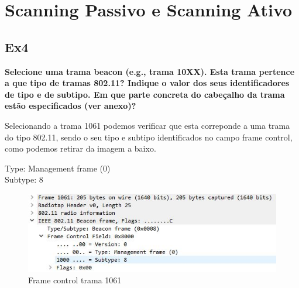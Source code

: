 \documentclass{article}
\begin{document}
\section{Scanning Passivo e Scanning Ativo}
\subsection{Ex4}
\textbf{Selecione uma trama beacon (e.g., trama 10XX). Esta trama pertence a que tipo de tramas 802.11? Indique o valor dos seus identificadores de tipo e de subtipo. Em que parte concreta do cabeçalho da trama estão especificados (ver anexo)?
}\\\par
Selecionando a trama 1061 podemos verificar que esta correponde a uma trama do tipo 802.11, sendo o seu tipo e subtipo identificados no campo frame control, como podemos retirar da imagem a baixo.\\
\begin{center}
Type: Management frame (0)\\
Subtype: 8
\end{center}
\begin{figure}[h]
	\centering
	\includegraphics[scale = 0.8]{ex-4.JPG}
	\caption{Frame control trama 1061}
\end{figure}
\end{document}
